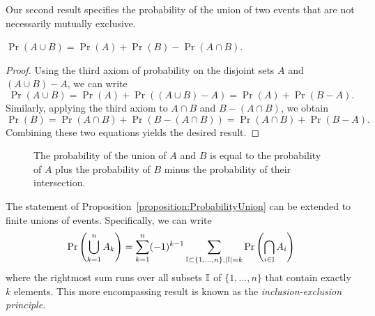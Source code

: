 Our second result specifies the probability of the union of two events that are not necessarily mutually exclusive.
\begin{proposition} \label{proposition:ProbabilityUnion}
$\Pr (A \cup B) = \Pr (A) + \Pr (B) - \Pr (A \cap B)$.
\end{proposition}
\begin{proof}
Using the third axiom of probability on the disjoint sets $A$ and $(A \cup B) - A$, we can write
\begin{equation*}
\Pr (A \cup B)
= \Pr (A) + \Pr ((A \cup B) - A)
= \Pr (A) + \Pr (B - A) .
\end{equation*}
Similarly, applying the third axiom to $A \cap B$ and $B - (A \cap B)$, we obtain
\begin{equation*}
\Pr (B)
= \Pr (A \cap B) + \Pr (B - (A \cap B))
= \Pr (A \cap B) + \Pr (B - A) .
\end{equation*}
Combining these two equations yields the desired result.
\end{proof}
\begin{figure}[htb!]
\begin{center}
\caption{The probability of the union of $A$ and $B$ is equal to the probability of $A$ plus the probability of $B$ minus the probability of their intersection.}
\end{center}
\end{figure}

The statement of Proposition~\ref{proposition:ProbabilityUnion} can be extended to finite unions of events.
Specifically, we can write
\begin{equation*}
\Pr \left( \bigcup_{k=1}^{n} A_k \right)
= \sum_{k = 1}^{n} (-1)^{k-1} \sum_{\mathbb{I} \subset \{1, \ldots, n \}, |\mathbb{I}| =k } \Pr \left( \bigcap_{i \in \mathbb{I}} A_i \right)
\end{equation*}
where the rightmost sum runs over all subsets $\mathbb{I}$ of $\{ 1, \ldots, n \}$ that contain exactly $k$ elements.
This more encompassing result is known as the \emph{inclusion-exclusion principle}.

